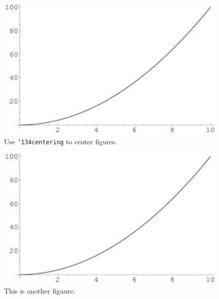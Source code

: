 
\begin{figure}[ht]
  \centering
  \includegraphics{figs/plot.pdf}
  \caption{Use {\tt \char'134centering\/} to center figures.}
  \label{fi:centered}
\end{figure}


\begin{figure}[ht]
  \centering
  \includegraphics{figs/plot.pdf}
  \caption{This is another figuure.}
  \label{fi:another}
\end{figure}


